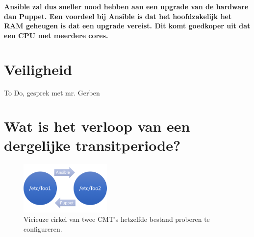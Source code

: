  \textbf{Ansible zal dus sneller nood hebben aan een upgrade van de hardware dan Puppet. Een voordeel bij Ansible is dat het hoofdzakelijk het RAM geheugen is dat een upgrade vereist. Dit komt goedkoper uit dat een CPU met meerdere cores.}
 \section{Veiligheid}
 
 To Do, gesprek met mr. Gerben
\section{Wat is het verloop van een dergelijke transitperiode?}
\label{sec:methodologie-verloop-transit}



\begin{figure}
\centering
\includegraphics[width=0.4\textwidth]{img/vicieuzecirkel.PNG}
\caption{\label{fig:vicieuzecirkel}Vicieuze cirkel van twee \gls{CMT}'s hetzelfde bestand proberen te configureren.}
\end{figure}

